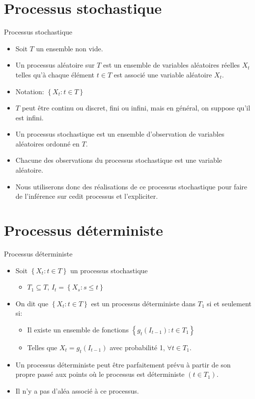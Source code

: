 \documentclass{beamer}
\begin{document}
\section{Processus stochastique}
\frame{\tableofcontents[current]}

\begin{frame}{Processus stochastique}
\begin{itemize}
\item Soit $T$ un ensemble non vide. 
\item Un processus aléatoire sur $T$ est un ensemble de variables aléatoires réelles $X_t$ telles qu’à chaque élément $t \in T$ est associé une variable aléatoire $X_t$.
\item Notation: $\left\{ X_t: t \in T \right\}$
\item $T$ peut être continu ou discret, fini ou infini, mais en général, on suppose qu’il est infini.
\item Un processus stochastique est un ensemble d’observation de variables aléatoires ordonné en $T$.
\item Chacune des observations du processus stochastique est une variable aléatoire.
\item Nous utiliserons donc des réalisations de ce processus stochastique pour faire de l’inférence sur cedit processus et l’expliciter.
\end{itemize}
\end{frame}

\section{Processus déterministe}
\frame{\tableofcontents[current]}

\begin{frame}{Processus déterministe}
\begin{itemize}
\item Soit $\left\{ X_t : t \in T \right\}$ un processus stochastique 
\begin{itemize}
\item $T_1 \subseteq T$,  $I_t = \left\{X_s : s \leq t\right\}$
\end{itemize}
\item On dit que $\left\{X_t : t \in T \right\}$ est un processus déterministe dans $T_1$ si et seulement si:
\begin{itemize}
\item Il existe un ensemble de fonctions $\left\{g_t(I_{t-1}) : t \in T_1 \right\}$
\item Telles que $X_t = g_t(I_{t-1})$ avec probabilité 1, $\forall t \in T_1$.
\end{itemize}
\item Un processus déterministe peut être parfaitement prévu à partir de son propre passé aux points où le processus est déterministe $(t \in T_1)$. 
\item Il n’y a pas d’aléa associé à ce processus.
\end{itemize}
\end{frame}
\end{document}
